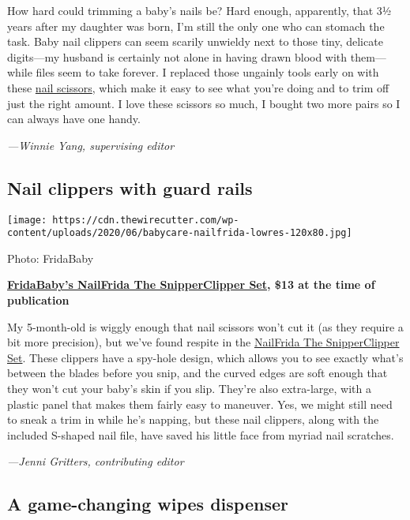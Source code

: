 How hard could trimming a baby's nails be? Hard enough, apparently, that
3½ years after my daughter was born, I'm still the only one who can
stomach the task. Baby nail clippers can seem scarily unwieldy next to
those tiny, delicate digits---my husband is certainly not alone in
having drawn blood with them---while files seem to take forever. I
replaced those ungainly tools early on with these
\href{https://www.nytimes3xbfgragh.onion/wirecutter/out/link/39077/162832/4/115958/?merchant=Amazon}{nail
scissors}, which make it easy to see what you're doing and to trim off
just the right amount. I love these scissors so much, I bought two more
pairs so I can always have one handy.

\emph{---Winnie Yang, supervising editor}

\hypertarget{nail-clippers-with-guard-rails}{%
\subsection{Nail clippers with guard
rails}\label{nail-clippers-with-guard-rails}}

\texttt{[image: https://cdn.thewirecutter.com/wp-content/uploads/2020/06/babycare-nailfrida-lowres-120x80.jpg]}

Photo: FridaBaby

\textbf{\href{https://www.nytimes3xbfgragh.onion/wirecutter/out/link/39071/162826/4/115959/?merchant=Amazon}{FridaBaby's
NailFrida The SnipperClipper Set}, \$13 at the time of publication}

My 5-month-old is wiggly enough that nail scissors won't cut it (as they
require a bit more precision), but we've found respite in the
\href{https://www.nytimes3xbfgragh.onion/wirecutter/out/link/39071/162826/4/115959/?merchant=Amazon}{NailFrida
The SnipperClipper Set}. These clippers have a spy-hole design, which
allows you to see exactly what's between the blades before you snip, and
the curved edges are soft enough that they won't cut your baby's skin if
you slip. They're also extra-large, with a plastic panel that makes them
fairly easy to maneuver. Yes, we might still need to sneak a trim in
while he's napping, but these nail clippers, along with the included
S-shaped nail file, have saved his little face from myriad nail
scratches.

\emph{---Jenni Gritters, contributing editor}

\hypertarget{a-game-changing-wipes-dispenser}{%
\subsection{A game-changing wipes
dispenser}\label{a-game-changing-wipes-dispenser}}

